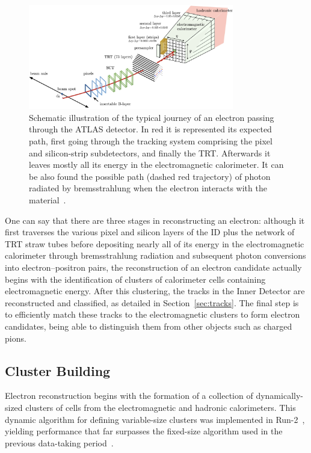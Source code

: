 \begin{figure}[htbp]
  \centering
  \includegraphics[width=0.8\textwidth]{images/electron_journey.png}
  \caption{Schematic illustration of the typical journey of an electron passing through the ATLAS detector. In red it is represented its expected path, first going through the tracking system comprising the pixel and silicon-strip subdetectors, and finally the TRT. Afterwards it leaves mostly all its energy in the electromagnetic calorimeter. It can be also found the possible path (dashed red trajectory) of photon radiated by bremsstrahlung when the electron interacts with the material~\cite{Aaboud:2657964}.}
  \label{electron_journey}
\end{figure}
One can say that there are three stages in reconstructing an electron: although it first traverses the various pixel and silicon layers of the ID plus the network of TRT straw tubes before depositing nearly all of its energy in the electromagnetic calorimeter through bremsstrahlung radiation and subsequent photon conversions into electron–positron pairs, the reconstruction of an electron candidate actually begins with the identification of clusters of calorimeter cells containing electromagnetic energy. After this clustering, 
the tracks in the Inner Detector are reconstructed and classified, as detailed in Section~\ref{sec:tracks}. The final step is to efficiently match these tracks to the electromagnetic clusters to form electron candidates, being able to distinguish them from other objects such as charged pions.

\subsection{Cluster Building}


Electron reconstruction begins with the formation of a collection of dynamically-sized clusters of cells from the electromagnetic and hadronic calorimeters. This dynamic algorithm for defining variable-size clusters was implemented in Run-2~\cite{dyn_clust}, yielding performance that far surpasses the fixed-size algorithm used in the previous data-taking period~\cite{fix_clust}.


